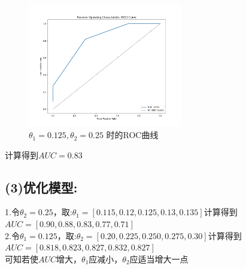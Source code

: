 \documentclass{article}
\begin{document}
\begin{figure}[h]
    \centering
    \includegraphics[width=0.6\textwidth]{Figure_1.png}
    \caption{$\theta_1=0.125,\theta_2=0.25$ 时的ROC曲线} %
    \label{fig:example} %
\end{figure}
计算得到$AUC=0.83$

\subsection{(3)优化模型:}
1.令$\theta_2=0.25$，取:$\theta_1=[0.115,0.12,0.125,0.13,0.135]$计算得到$AUC=[0.90,0.88,0.83,0.77,0.71]$\\
2.令$\theta_1=0.125$，取:$\theta_2=[0.20,0.225,0.250,0.275,0.30]$计算得到$AUC=[0.818,0.823,0.827,0.832,0.827]$\\

可知若使$AUC$增大，$\theta_1$应减小，$\theta_2$应适当增大一点
\end{document}
